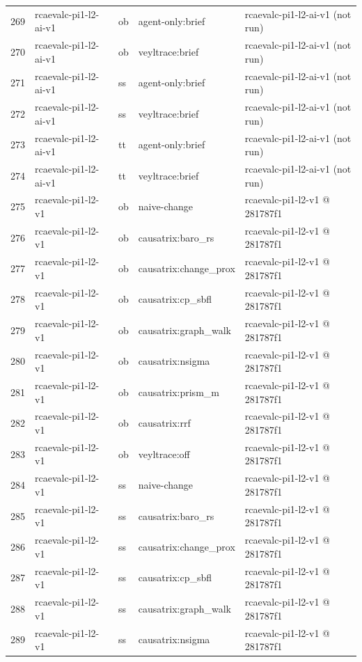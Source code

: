 \begin{longtable}{@{}r>{\raggedright\arraybackslash}p{87.0pt}>{\raggedright\arraybackslash}p{18.0pt}>{\raggedright\arraybackslash}p{63.0pt}>{\raggedright\arraybackslash}p{108.0pt}@{}}
269 & rcaevalc-pi1-l2-ai-v1 & ob & agent-only:brief & rcaevalc-pi1-l2-ai-v1 (not run) \\
270 & rcaevalc-pi1-l2-ai-v1 & ob & veyltrace:brief & rcaevalc-pi1-l2-ai-v1 (not run) \\
271 & rcaevalc-pi1-l2-ai-v1 & ss & agent-only:brief & rcaevalc-pi1-l2-ai-v1 (not run) \\
272 & rcaevalc-pi1-l2-ai-v1 & ss & veyltrace:brief & rcaevalc-pi1-l2-ai-v1 (not run) \\
273 & rcaevalc-pi1-l2-ai-v1 & tt & agent-only:brief & rcaevalc-pi1-l2-ai-v1 (not run) \\
274 & rcaevalc-pi1-l2-ai-v1 & tt & veyltrace:brief & rcaevalc-pi1-l2-ai-v1 (not run) \\
275 & rcaevalc-pi1-l2-v1 & ob & naive-change & rcaevalc-pi1-l2-v1 @ 281787f1 \\
276 & rcaevalc-pi1-l2-v1 & ob & causatrix:baro\_rs & rcaevalc-pi1-l2-v1 @ 281787f1 \\
277 & rcaevalc-pi1-l2-v1 & ob & causatrix:change\_prox & rcaevalc-pi1-l2-v1 @ 281787f1 \\
278 & rcaevalc-pi1-l2-v1 & ob & causatrix:cp\_sbfl & rcaevalc-pi1-l2-v1 @ 281787f1 \\
279 & rcaevalc-pi1-l2-v1 & ob & causatrix:graph\_walk & rcaevalc-pi1-l2-v1 @ 281787f1 \\
280 & rcaevalc-pi1-l2-v1 & ob & causatrix:nsigma & rcaevalc-pi1-l2-v1 @ 281787f1 \\
281 & rcaevalc-pi1-l2-v1 & ob & causatrix:prism\_m & rcaevalc-pi1-l2-v1 @ 281787f1 \\
282 & rcaevalc-pi1-l2-v1 & ob & causatrix:rrf & rcaevalc-pi1-l2-v1 @ 281787f1 \\
283 & rcaevalc-pi1-l2-v1 & ob & veyltrace:off & rcaevalc-pi1-l2-v1 @ 281787f1 \\
284 & rcaevalc-pi1-l2-v1 & ss & naive-change & rcaevalc-pi1-l2-v1 @ 281787f1 \\
285 & rcaevalc-pi1-l2-v1 & ss & causatrix:baro\_rs & rcaevalc-pi1-l2-v1 @ 281787f1 \\
286 & rcaevalc-pi1-l2-v1 & ss & causatrix:change\_prox & rcaevalc-pi1-l2-v1 @ 281787f1 \\
287 & rcaevalc-pi1-l2-v1 & ss & causatrix:cp\_sbfl & rcaevalc-pi1-l2-v1 @ 281787f1 \\
288 & rcaevalc-pi1-l2-v1 & ss & causatrix:graph\_walk & rcaevalc-pi1-l2-v1 @ 281787f1 \\
289 & rcaevalc-pi1-l2-v1 & ss & causatrix:nsigma & rcaevalc-pi1-l2-v1 @ 281787f1 \\

\end{longtable}
